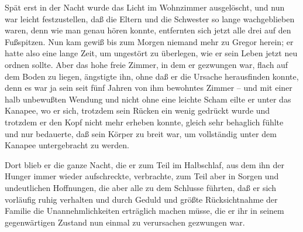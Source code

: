 Spät erst in der Nacht wurde das Licht im Wohnzimmer ausgelöscht, und
nun war leicht festzustellen, daß die Eltern und die Schwester so lange
wachgeblieben waren, denn wie man genau hören konnte, entfernten sich
jetzt alle drei auf den Fußspitzen. Nun kam gewiß bis zum Morgen niemand
mehr zu Gregor herein; er hatte also eine lange Zeit, um ungestört zu
überlegen, wie er sein Leben jetzt neu ordnen sollte. Aber das hohe
freie Zimmer, in dem er gezwungen war, flach auf dem Boden zu liegen,
ängstigte ihn, ohne daß er die Ursache herausfinden konnte, denn es war
ja sein seit fünf Jahren von ihm bewohntes Zimmer -- und mit einer halb
unbewußten Wendung und nicht ohne eine leichte Scham eilte er unter das
Kanapee, wo er sich, trotzdem sein Rücken ein wenig gedrückt wurde und
trotzdem er den Kopf nicht mehr erheben konnte, gleich sehr behaglich
fühlte und nur bedauerte, daß sein Körper zu breit war, um vollständig
unter dem Kanapee untergebracht zu werden.

Dort blieb er die ganze Nacht, die er zum Teil im Halbschlaf, aus dem
ihn der Hunger immer wieder aufschreckte, verbrachte, zum Teil aber in
Sorgen und undeutlichen Hoffnungen, die aber alle zu dem Schlusse
führten, daß er sich vorläufig ruhig verhalten und durch Geduld und
größte Rücksichtnahme der Familie die Unannehmlichkeiten erträglich
machen müsse, die er ihr in seinem gegenwärtigen Zustand nun einmal zu
verursachen gezwungen war.

